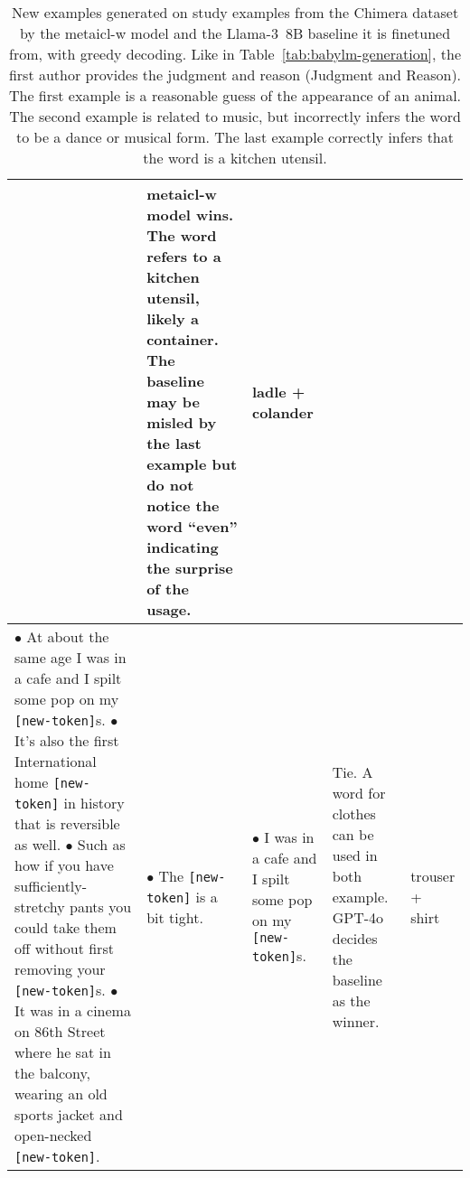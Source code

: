 \documentclass{article}
\begin{document}
\begin{table*}[t]
\begin{center}
\begin{tabular}{p{5.5cm}p{2cm}p{2cm}p{3cm}p{1.3cm}}
& \ac{metaicl-w} model wins. The word refers to a kitchen utensil, likely a container. The baseline may be misled by the last example but do not notice the word ``even'' indicating the surprise of the usage.
& \mbox{ladle} + \mbox{colander}
\\
\midrule
$\bullet$ At about the same age I was in a cafe and I spilt some pop on my \texttt{[new-token]}s.
$\bullet$ It's also the first International home \texttt{[new-token]} in history that is reversible as well.
$\bullet$ Such as how if you have sufficiently-stretchy pants you could take them off without first removing your \texttt{[new-token]}s.
$\bullet$ It was in a cinema on 86th Street where he sat in the balcony, wearing an old sports jacket and open-necked \texttt{[new-token]}.
& $\bullet$ The \texttt{[new-token]} is a bit tight.
& $\bullet$ I was in a cafe and I spilt some pop on my \texttt{[new-token]}s.
& Tie. A word for clothes can be used in both example. \mbox{GPT-4o} decides the baseline as the winner.
& \mbox{trouser} + \mbox{shirt} \\
\bottomrule
\end{tabular}
\end{center}
\caption{New examples generated on study examples from the Chimera dataset \citep{Lazaridou2017MultimodalWM} by the \ac{metaicl-w} model and the \mbox{Llama-3 8B} baseline it is finetuned from, with greedy decoding.
Like in Table~\ref{tab:babylm-generation}, the first author provides the judgment and reason (Judgment and Reason).
The first example is a reasonable guess of the appearance of an animal.
The second example is related to music, but incorrectly infers the word to be a dance or musical form.
The last example correctly infers that the word is a kitchen utensil.
}
\label{tab:chimera-generation}
\end{table*}
\end{document}
